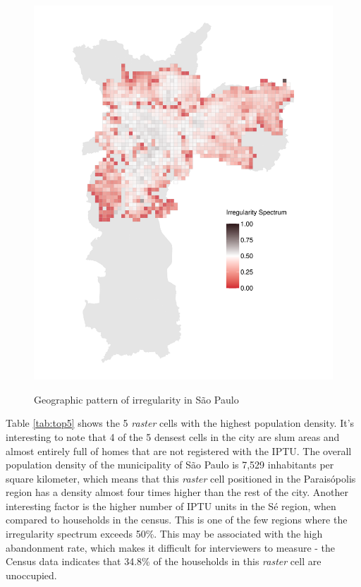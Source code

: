 \begin{apendicesenv}
    \begin{figure}[h]
        \caption{Geographic pattern of irregularity in São Paulo}
        \centering
        \includegraphics[width = .8\linewidth]{figuras/balanco_raster.pdf}
        \label{fig:balanco-raster}
    \end{figure}
    
    
    
    Table \ref{tab:top5} shows the 5 \textit{raster} cells with the highest population density. It's interesting to note that 4 of the 5 densest cells in the city are slum areas and almost entirely full of homes that are not registered with the IPTU. The overall population density of the municipality of São Paulo is 7,529 inhabitants per square kilometer, which means that this \textit{raster} cell positioned in the Paraisópolis region has a density almost four times higher than the rest of the city. Another interesting factor is the higher number of IPTU units in the Sé region, when compared to households in the census. This is one of the few regions where the irregularity spectrum exceeds 50\%. This may be associated with the high abandonment rate, which makes it difficult for interviewers to measure - the Census data indicates that 34.8\% of the households in this \textit{raster} cell are unoccupied.
    

\end{apendicesenv}
